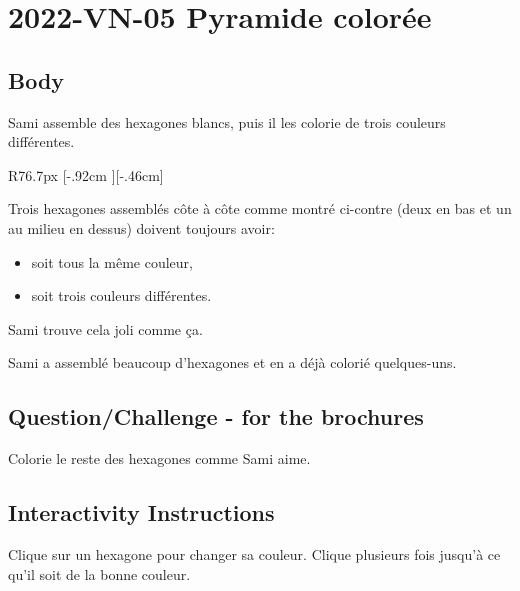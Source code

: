 \documentclass[a4paper,11pt]{report}
\newcommand{\taskGraphicsFolder}{..}
\begin{document}
\section*{\centering{} 2022-VN-05 Pyramide colorée}


\subsection*{Body}

Sami assemble des hexagones blancs, puis il les colorie de trois couleurs différentes.

\begin{wrapfigure}{R}{76.7px}
\raisebox{-.46cm}[\dimexpr \height-.92cm \relax][-.46cm]{}
\end{wrapfigure}

Trois hexagones assemblés côte à côte comme montré ci-contre (deux en bas et un au milieu en dessus) doivent toujours avoir:

\begin{itemize}
  \item soit tous la même couleur,
  \item soit trois couleurs différentes.
\end{itemize}

Sami trouve cela joli comme ça.

Sami a assemblé beaucoup d’hexagones et en a déjà colorié quelques-uns.

{\em


\subsection*{Question/Challenge - for the brochures}

Colorie le reste des hexagones comme Sami aime.

{\centering%
\par}

}


\subsection*{Interactivity Instructions}

Clique sur un hexagone pour changer sa couleur. Clique plusieurs fois jusqu’à ce qu’il soit de la bonne couleur.

\begingroup
\renewcommand{\arraystretch}{1.5}
\end{document}
